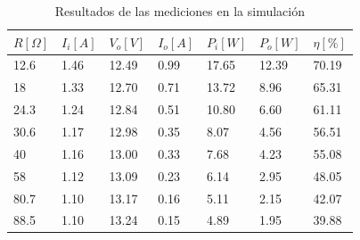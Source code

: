 \begin{table}[H]
    \centering
    \begin{tabular}{lllllll}
    \hline
    $R[\Omega]$ & $I_i[A]$ & $V_o[V]$ & $I_o[A]$ & \multicolumn{1}{c}{$P_i[W]$} & \multicolumn{1}{c}{$P_o[W]$} & \multicolumn{1}{c}{$\eta[\%]$} \\ \hline
    12.6        & 1.46     & 12.49    & 0.99     & 17.65                        & 12.39                        & 70.19                          \\
    18          & 1.33     & 12.70    & 0.71     & 13.72                        & 8.96                         & 65.31                          \\
    24.3        & 1.24     & 12.84    & 0.51     & 10.80                        & 6.60                         & 61.11                          \\
    30.6        & 1.17     & 12.98    & 0.35     & 8.07                         & 4.56                         & 56.51                          \\
    40          & 1.16     & 13.00    & 0.33     & 7.68                         & 4.23                         & 55.08                          \\
    58          & 1.12     & 13.09    & 0.23     & 6.14                         & 2.95                         & 48.05                          \\
    80.7        & 1.10     & 13.17    & 0.16     & 5.11                         & 2.15                         & 42.07                          \\
    88.5        & 1.10     & 13.24    & 0.15     & 4.89                         & 1.95                         & 39.88                          \\ \hline
    \end{tabular}
    \caption{Resultados de las mediciones en la simulación}
    \label{tab:mediciones_sim}
\end{table}